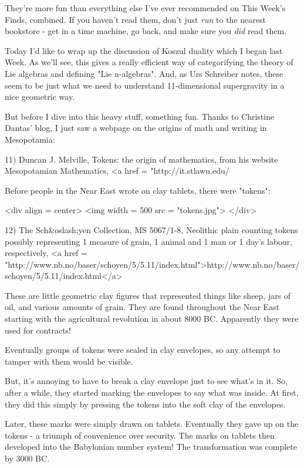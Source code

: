 They're more fun than everything else I've ever recommended on This
Week's Finds, combined.  If you haven't read them, don't just
\emph{run} to the nearest bookstore - get in a time machine, go
back, and make sure you \emph{did} read them.

Today I'd like to wrap up the discussion of Koszul duality which I 
began last Week.  As we'll see, this gives a really efficient way
of categorifying the theory of Lie algebras and defining "Lie 
n-algebras".  And, as Urs Schreiber notes, these seem to be just 
what we need to understand 11-dimensional supergravity in a nice
geometric way.

But before I dive into this heavy stuff, something fun.   Thanks to
Christine Dantas' blog, I just saw a webpage on the origins of math 
and writing in Mesopotamia:

11) Duncan J. Melville, Tokens: the origin of mathematics,
from his website Mesopotamian Mathematics,
<a href = "http://it.stlawu.edu/%

Before people in the Near East wrote on clay tablets, there were "tokens":

<div align = center>
<img width = 500 src = "tokens.jpg">
</div>

12) The Sch&oslash;yen Collection,
MS 5067/1-8, Neolithic plain counting tokens possibly representing 1 measure of grain, 1 animal and 1 man or 1 day's labour, respectively, 
<a href = "http://www.nb.no/baser/schoyen/5/5.11/index.html">http://www.nb.no/baser/schoyen/5/5.11/index.html</a>

These are little geometric clay figures that represented things like
sheep, jars of oil, and various amounts of grain.  They are found
throughout the Near East starting with the agricultural revolution in
about 8000 BC.  Apparently they were used for contracts!  

Eventually groups of tokens were sealed in clay envelopes, so any 
attempt to tamper with them would be visible.

But, it's annoying to have to break a clay envelope just to see what's 
in it.  So, after a while, they started marking the envelopes to say 
what was inside.  At first, they did this simply by pressing the tokens
into the soft clay of the envelopes.

Later, these marks were simply drawn on tablets.  Eventually they gave
up on the tokens - a triumph of convenience over security.  The marks 
on tablets then developed into the Babylonian number system!  The 
transformation was complete by 3000 BC.

